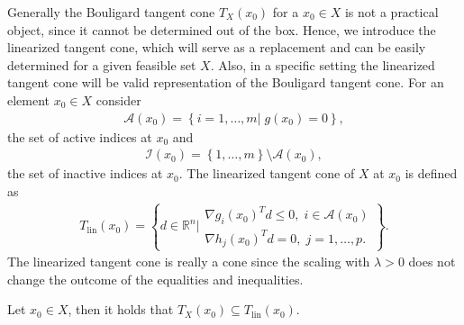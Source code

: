 Generally the Bouligard tangent cone $T_X(x_0)$ for a $x_0 \in X$ is not a
practical object, since it cannot be determined out of the box. Hence, we
introduce the linearized tangent cone, which will serve as a replacement and
can be easily determined for a given feasible set $X$. Also, in a specific
setting the linearized tangent cone will be valid representation of the
Bouligard tangent cone. For an element $x_0 \in X$ consider
\begin{align}
    \mathcal{A}(x_0) = \left\{ i = 1,\ldots,m|\;g(x_0) = 0 \right\},
\end{align}
the set of active indices at $x_0$ and
\begin{align}
    \mathcal{I}(x_0) = \left\{1,\ldots,m \right\}\setminus\mathcal{A}(x_0),
\end{align}
the set of inactive indices at $x_0$. The linearized tangent cone of $X$ at
$x_0$ is defined as
\begin{align}
    T_{\text{lin} }(x_0) = \left\{
        d\in \mathbb{R}^{n} \Big|
        \begin{array}{l}
            \nabla g_i(x_0)^{T} d \le 0,\; i \in \mathcal{A}(x_0)\\
            \nabla h_j(x_0)^{T} d = 0,\; j=1,\ldots,p.
        \end{array} \right\}.
\end{align}
The linearized tangent cone is really a cone since the scaling with
$\lambda>0$ does not change the outcome of the equalities and inequalities.
\begin{lemma}
    Let $x_{0} \in X$, then it holds that $T_X(x_0) \subseteq
    T_{\text{lin}}(x_0)$.
\end{lemma}
